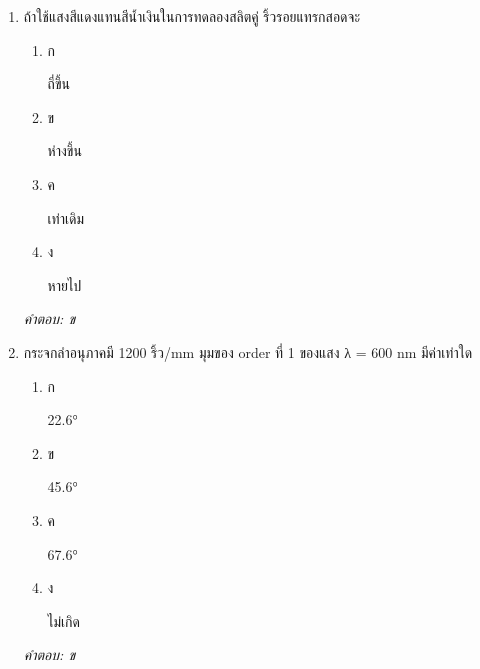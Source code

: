 \documentclass[12pt]{article}
\begin{document}
\begin{enumerate}[label=\arabic*., itemsep=0.5\baselineskip, topsep=0.5\baselineskip, leftmargin=*]
\item ถ้าใช้แสงสีแดงแทนสีน้ำเงินในการทดลองสลิตคู่ ริ้วรอยแทรกสอดจะ
\begin{enumerate}[label=\alph*)., itemsep=0.3\baselineskip, topsep=0.3\baselineskip]
\item ก\ 
\begin{minipage}[t]{0.9\linewidth}
\raggedright ถี่ขึ้น
\end{minipage}
\item ข\ 
\begin{minipage}[t]{0.9\linewidth}
\raggedright ห่างขึ้น
\end{minipage}
\item ค\ 
\begin{minipage}[t]{0.9\linewidth}
\raggedright เท่าเดิม
\end{minipage}
\item ง\ 
\begin{minipage}[t]{0.9\linewidth}
\raggedright หายไป
\end{minipage}
\end{enumerate}
\vspace{-0.3\baselineskip}
\begin{small}
\textit{คำตอบ: ข}
\end{small}

\item กระจกลำอนุภาคมี 1200 ริ้ว/mm มุมของ order ที่ 1 ของแสง λ = 600 nm มีค่าเท่าใด
\begin{enumerate}[label=\alph*)., itemsep=0.3\baselineskip, topsep=0.3\baselineskip]
\item ก\ 
\begin{minipage}[t]{0.9\linewidth}
\raggedright 22.6°
\end{minipage}
\item ข\ 
\begin{minipage}[t]{0.9\linewidth}
\raggedright 45.6°
\end{minipage}
\item ค\ 
\begin{minipage}[t]{0.9\linewidth}
\raggedright 67.6°
\end{minipage}
\item ง\ 
\begin{minipage}[t]{0.9\linewidth}
\raggedright ไม่เกิด
\end{minipage}
\end{enumerate}
\vspace{-0.3\baselineskip}
\begin{small}
\textit{คำตอบ: ข}
\end{small}


\end{enumerate}
\end{document}
